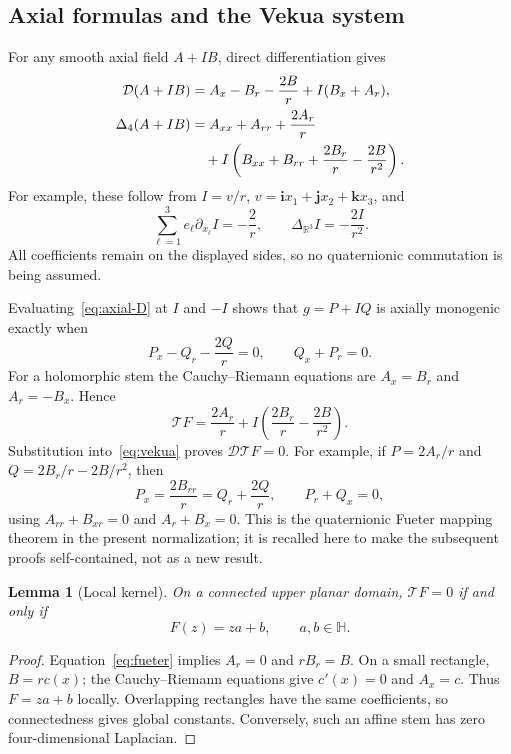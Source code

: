 \documentclass[11pt,a4paper]{article}
\numberwithin{equation}{section}
\newtheorem{lemma}[theorem]{Lemma}
\theoremstyle{definition}
\theoremstyle{remark}
\newcommand{\R}{\mathbb R}
\newcommand{\HH}{\mathbb H}
\newcommand{\T}{\mathcal T}
\newcommand{\D}{\mathcal D}
\newcommand{\Lap}{\Delta_4}
\begin{document}
\subsection{Axial formulas and the Vekua system}
For any smooth axial field $A+IB$, direct differentiation gives
\begin{align}
 \D(A+IB)&=A_x-B_r-\frac{2B}{r}+I(B_x+A_r),\label{eq:axial-D}\\
 \Lap(A+IB)&=A_{xx}+A_{rr}+\frac{2A_r}{r}\notag\\
 &\quad+I\left(B_{xx}+B_{rr}+\frac{2B_r}{r}-\frac{2B}{r^2}\right).
 \label{eq:axial-lap}
\end{align}
For example, these follow from $I=v/r$, $v=\mathbf i x_1+\mathbf j x_2+
\mathbf k x_3$, and
\[
 \sum_{\ell=1}^3 e_\ell\partial_{x_\ell}I=-\frac2r,
 \qquad \Delta_{\R^3}I=-\frac{2I}{r^2}.
\]
All coefficients remain on the displayed sides, so no quaternionic
commutation is being assumed.

Evaluating~\eqref{eq:axial-D} at $I$ and $-I$ shows that $g=P+IQ$ is
axially monogenic exactly when
\begin{equation}
 P_x-Q_r-\frac{2Q}{r}=0,\qquad Q_x+P_r=0.
 \label{eq:vekua}
\end{equation}
For a holomorphic stem the Cauchy--Riemann equations are
$A_x=B_r$ and $A_r=-B_x$. Hence
\begin{equation}
 \T F=\frac{2A_r}{r}
       +I\left(\frac{2B_r}{r}-\frac{2B}{r^2}\right).
 \label{eq:fueter}
\end{equation}
Substitution into~\eqref{eq:vekua} proves $\D\T F=0$.
For example, if $P=2A_r/r$ and $Q=2B_r/r-2B/r^2$, then
\[
 P_x=\frac{2B_{rr}}r=Q_r+\frac{2Q}r,
 \qquad P_r+Q_x=0,
\]
using $A_{rr}+B_{xr}=0$ and $A_r+B_x=0$.
This is the quaternionic Fueter mapping theorem in the present
normalization; it is recalled here to make the subsequent proofs
self-contained, not as a new result.

\begin{lemma}[Local kernel]\label{lem:kernel}
On a connected upper planar domain, $\T F=0$ if and only if
\[
 F(z)=za+b,\qquad a,b\in\HH.
\]
\end{lemma}
\begin{proof}
Equation~\eqref{eq:fueter} implies $A_r=0$ and $rB_r=B$.
On a small rectangle, $B=r c(x)$; the Cauchy--Riemann equations give
$c'(x)=0$ and $A_x=c$. Thus $F=za+b$ locally. Overlapping rectangles
have the same coefficients, so connectedness gives global constants.
Conversely, such an affine stem has zero four-dimensional Laplacian.
\end{proof}
\end{document}
